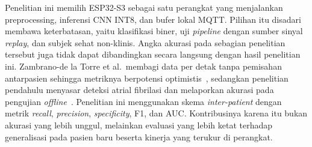 Penelitian ini memilih ESP32-S3 sebagai satu perangkat yang menjalankan preprocessing, inferensi CNN INT8, dan bufer lokal MQTT. Pilihan itu disadari membawa keterbatasan, yaitu klasifikasi biner, uji \textit{pipeline} dengan sumber sinyal \textit{replay}, dan subjek sehat non-klinis. Angka akurasi pada sebagian penelitian tersebut juga tidak dapat dibandingkan secara langsung dengan hasil penelitian ini. Zambrano-de la Torre et al.\ membagi data per detak tanpa pemisahan antarpasien sehingga metriknya berpotensi optimistis~\cite{zambrano_2026, xiao_2023}, sedangkan penelitian pendahulu menyasar deteksi atrial fibrilasi dan melaporkan akurasi pada pengujian \textit{offline}~\cite{mulyawan_2026}. Penelitian ini menggunakan skema \textit{inter-patient} dengan metrik \textit{recall}, \textit{precision}, \textit{specificity}, F1, dan AUC. Kontribusinya karena itu bukan akurasi yang lebih unggul, melainkan evaluasi yang lebih ketat terhadap generalisasi pada pasien baru beserta kinerja yang terukur di perangkat.
